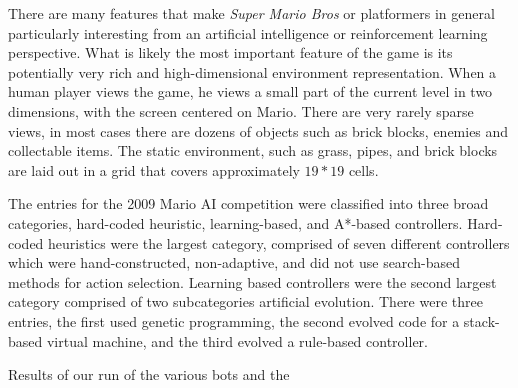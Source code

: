 \documentclass[12pt]{article}
\begin{document}
\begin{multicols*}{2}
There are many features that make \textit {Super Mario Bros} or platformers in general particularly interesting from 
an artificial intelligence or reinforcement learning perspective. What is likely the most important feature of the game 
is its potentially very rich and high-dimensional environment representation. When a human player views the 
game, he views a small part of the current level in two dimensions, with the screen centered on Mario. There are 
very rarely sparse views, in most cases there are dozens of objects such as brick blocks, enemies and collectable 
items. The static environment, such as grass, pipes, and brick blocks are laid out in a grid that covers 
approximately $19 * 19$ cells.

The entries for the 2009 Mario AI competition were classified into three broad categories, hard-coded heuristic, 
learning-based, and A*-based controllers. Hard-coded heuristics were the largest category, comprised of seven 
different controllers which were hand-constructed, non-adaptive, and did not use search-based methods for action selection. Learning based controllers were the second largest category comprised of two subcategories artificial evolution. There were three entries, the first used genetic programming, the second evolved code for a stack-based virtual machine, and the third evolved a rule-based controller. 
\end{multicols*}

\begin{table}[h]
\centering
{}
\caption{Controller Scores}
\end{table}
Results of our run of the various bots and the 
\end{document}
